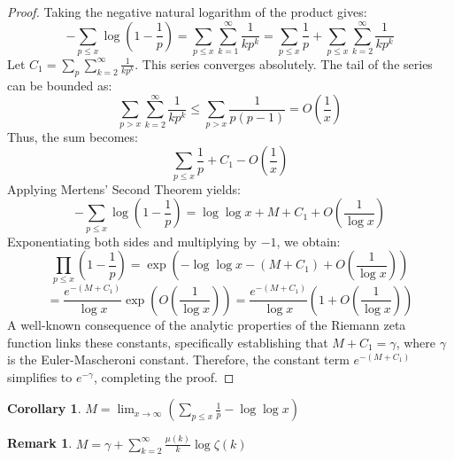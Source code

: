 \documentclass[a4paper]{article}
\newtheorem{corollary}[theorem]{Corollary}
\newtheorem{remark}[theorem]{Remark}
\begin{document}
\begin{proof}
  Taking the negative natural logarithm of the product gives:
  \[ -\sum_{p \le x} \log\left(1 - \frac{1}{p}\right) = \sum_{p \le
    x} \sum_{k=1}^{\infty} \frac{1}{k p^k} = \sum_{p \le x} \frac{1}{p}
  + \sum_{p \le x} \sum_{k=2}^{\infty} \frac{1}{k p^k} \]
  Let $C_1 = \sum_{p} \sum_{k=2}^{\infty} \frac{1}{k p^k}$. This
  series converges absolutely. The tail of the series can be bounded as:
  \[ \sum_{p > x} \sum_{k=2}^{\infty} \frac{1}{k p^k} \le \sum_{p >
  x} \frac{1}{p(p-1)} = O\left(\frac{1}{x}\right) \]
  Thus, the sum becomes:
  \[ \sum_{p \le x} \frac{1}{p} + C_1 - O\left(\frac{1}{x}\right) \]
  Applying Mertens' Second Theorem yields:
  \[ -\sum_{p \le x} \log\left(1 - \frac{1}{p}\right) = \log \log x +
  M + C_1 + O\left(\frac{1}{\log x}\right) \]
  Exponentiating both sides and multiplying by $-1$, we obtain:
  \[ \prod_{p \le x} \left(1 - \frac{1}{p}\right) = \exp\left(-\log
  \log x - (M + C_1) + O\left(\frac{1}{\log x}\right)\right) \]
  \[ = \frac{e^{-(M + C_1)}}{\log x} \exp\left(O\left(\frac{1}{\log
    x}\right)\right) = \frac{e^{-(M + C_1)}}{\log x} \left(1 +
  O\left(\frac{1}{\log x}\right)\right) \]
  A well-known consequence of the analytic properties of the Riemann
  zeta function links these constants, specifically establishing that
  $M + C_1 = \gamma$, where $\gamma$ is the Euler-Mascheroni
  constant. Therefore, the constant term $e^{-(M + C_1)}$ simplifies
  to $e^{-\gamma}$, completing the proof.
\end{proof}

\begin{corollary}
  $M = \lim_{x \to \infty} \left( \sum_{p \le x} \frac{1}{p} - \log
  \log x \right)$
\end{corollary}

\begin{remark}
  $M = \gamma + \sum_{k=2}^{\infty} \frac{\mu(k)}{k} \log \zeta(k)$
\end{remark}
\end{document}
